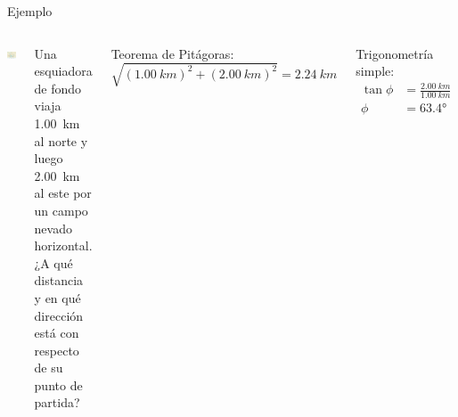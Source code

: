 \documentclass[9pt, aspectratio=169]{beamer}
\begin{document}
\begin{frame}{Ejemplo}
\begin{columns}
\cx
\begin{center}
\includegraphics[scale=0.3]{figs/fig-03.png}
\end{center}

\cx
Una esquiadora de fondo viaja \qty{1.00}{km} al norte y luego \qty{2.00}{km} al este por un campo nevado horizontal. ¿A qué distancia y en qué dirección está con respecto de su punto de partida?
\pause
\vspace{1em}

Teorema de Pitágoras:
\[ \sqrt{(\qty{1.00}{km})^2 + (\qty{2.00}{km})^2} = \qty{2.24}{km} \]

Trigonometría simple:
\begin{align*}
    \tan \phi &= \frac{\qty{2.00}{km}}{\qty{1.00}{km}} \\
    \phi &= \ang{63.4}
\end{align*}
\end{columns}
\end{frame}
\end{document}
